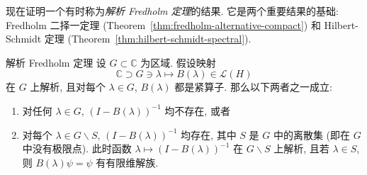 现在证明一个有时称为\emph{解析 Fredholm 定理}的结果. 它是两个重要结果的基础: Fredholm 二择一定理 (Theorem~\ref{thm:fredholm-alternative-compact}) 和 Hilbert-Schmidt 定理 (Theorem~\ref{thm:hilbert-schmidt-spectral}).

\begin{Theorem}{解析 Fredholm 定理}
\label{thm:analytic-fredholm}
设 $G\subset\mathbb{C}$ 为区域. 假设映射
\begin{equation}\label{eq:analytic-compact-fredholm-operator-family}
\mathbb{C}\supset G\ni\lambda\mapsto B(\lambda)\in\mathcal{L}(H)
\end{equation}
在 $G$ 上解析, 且对每个 $\lambda\in G$, $B(\lambda)$ 都是紧算子. 那么以下两者之一成立:\begin{enumerate}\item 对任何 $\lambda\in G$, $(I-B(\lambda))^{-1}$ 均不存在, 或者\item 对每个 $\lambda\in G\backslash S$, $(I-B(\lambda))^{-1}$ 均存在, 其中 $S$ 是 $G$ 中的离散集 (即在 $G$ 中没有极限点). 此时函数 $\lambda\mapsto(I-B(\lambda))^{-1}$ 在 $G\backslash S$ 上解析, 且若 $\lambda\in S$, 则 $B(\lambda)\psi=\psi$ 有有限维解族.\end{enumerate}
\end{Theorem}

